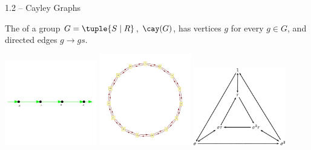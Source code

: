 \documentclass{beamer}
\theoremstyle{plain}
\begin{document}
\begin{frame}{1.2 -- Cayley Graphs}
  \begin{definition*}
    The  of a group $G = \tuple{S \mid R}$, $\cay(G)$, has
    vertices $g$ for every $g \in G$, and directed edges $g \to gs$. 
  \end{definition*}
  \begin{center}
    \pause
    \includegraphics[width=0.3\textwidth]{cayley-graph-Z.png}
    \pause\includegraphics[width=0.3\textwidth]{cayley-graph-Z_n.png}
    \pause
    \includegraphics[width=0.3\textwidth]{cayley-graph-S_3.png}
  \end{center}
\end{frame}
\end{document}
